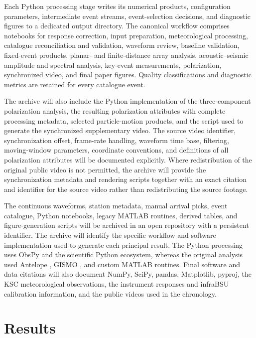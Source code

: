 \documentclass[]{seismica}
\begin{document}
Each Python processing stage writes its numerical products, configuration parameters, intermediate event streams, event-selection decisions, and diagnostic figures to a dedicated output directory. The canonical workflow comprises notebooks for response correction, input preparation, meteorological processing, catalogue reconciliation and validation, waveform review, baseline validation, fixed-event products, planar- and finite-distance array analysis, acoustic--seismic amplitude and spectral analysis, key-event measurements, polarization, synchronized video, and final paper figures. Quality classifications and diagnostic metrics are retained for every catalogue event.

The archive will also include the Python implementation of the
three-component polarization analysis, the resulting polarization attributes
with complete processing metadata, selected particle-motion products, and the
script used to generate the synchronized supplementary video. The source video identifier, synchronization
offset, frame-rate handling, waveform time base, filtering, moving-window
parameters, coordinate conventions, and definitions of all polarization
attributes will be documented explicitly. Where redistribution of the original
public video is not permitted, the archive will provide the synchronization
metadata and rendering scripts together with an exact citation and identifier
for the source video rather than redistributing the source footage.

The continuous waveforms, station metadata, manual arrival picks, event catalogue, Python notebooks, legacy MATLAB routines, derived tables, and figure-generation scripts will be archived in an open repository with a persistent identifier. The archive will identify the specific workflow and software implementation used to generate each principal result. The Python processing uses ObsPy \citep{beyreuther_obspy_2010,krischer_obspy_2015}
and the scientific Python ecosystem, whereas the original analysis used
Antelope \citep{brtt_antelope}, GISMO \citep{thompson_gismo_2017}, and custom
MATLAB routines. Final software and data citations will also document NumPy,
SciPy, pandas, Matplotlib, pyproj, the KSC meteorological observations, the
instrument responses and infraBSU calibration information, and the public
videos used in the chronology.

\section{Results}
\label{sec:results}
\end{document}
